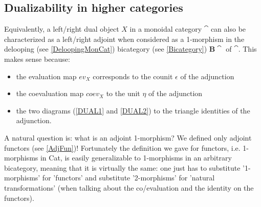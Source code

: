 \subsection{Dualizability in higher categories \extra} %
\label{ssub:left_and_right_duals_in_higher_categories}
Equivalently, a left/right dual object $X$ in a monoidal category $\cat$ can also be
 characterized as a left/right adjoint
 when considered as a 1-morphism in the delooping (see
  \ref{DeloopingMonCat}) bicategory (see \ref{Bicategory}) $\mathbf{B}\cat$ of $\cat$.
  This
   makes sense because:
\begin{itemize}
    \item the evaluation map $ev_X$ corresponds to the counit $\epsilon$ of the adjunction 
    \item the coevaluation map $coev_X$ to the unit $\eta$ of the adjunction
    \item the two diagrams (\ref{DUAL1} and \ref{DUAL2}) to the triangle identities of the adjunction.
\end{itemize} 
A natural question is: what is an adjoint 1-morphism?
We defined only adjoint functors (see \ref{AdjFun})! 
Fortunately the definition we gave for functors, i.e.
1-morphisms in Cat, is easily generalizable to 1-morphisms in an arbitrary bicategory,
meaning that it is virtually the same: one just has to substitute '1-morphisms' for 'functors'
and substitute '2-morphisms' for 'natural
transformations' (when talking about the co/evaluation and the identity on the functors).

